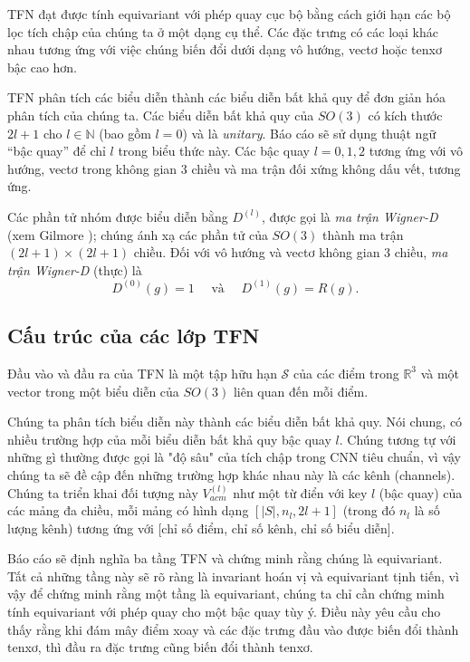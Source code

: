 TFN đạt được tính equivariant với phép quay cục bộ bằng cách giới hạn các bộ lọc tích chập của chúng ta ở một dạng cụ thể. Các
đặc trưng có các loại khác nhau tương ứng với việc chúng biến đổi dưới dạng vô hướng, vectơ hoặc tenxơ bậc cao hơn\cite{thomas2018tensorfieldnetworksrotation}. 

TFN phân tích các biểu diễn thành các biểu diễn bất khả quy để đơn giản hóa phân tích của chúng ta. Các biểu diễn
bất khả quy của $SO(3)$ có kích thước $2l+1$ cho $l \in \mathbb{N}$ (bao gồm $l=0$) và là \textit{unitary}. Báo cáo sẽ sử dụng thuật ngữ “bậc quay” để chỉ $l$ trong biểu thức này. Các bậc quay $l=0, 1, 2$  tương ứng với vô hướng, vectơ trong không gian 3 chiều và ma trận đối xứng không dấu vết, tương ứng.

Các phần tử nhóm được biểu diễn bằng $D^{(l)}$, được gọi là \textit{ma trận Wigner-D} (xem Gilmore \cite{gilmore2008lie}); chúng ánh xạ các phần tử của $SO(3)$ thành ma trận $(2l+1) \times (2l+1)$ chiều. Đối với vô hướng và vectơ không gian 3 chiều, \textit{ma trận Wigner-D} (thực) là
$$
D^{(0)}(g) = 1 \quad \text{ và } \quad D^{(1)}(g) = R(g).
$$

\subsection{Cấu trúc của các lớp TFN}
Đầu vào và đầu ra của TFN là một tập hữu hạn $\mathcal{S}$ của các điểm trong $\mathbb{R}^3$ và một vector trong một biểu diễn của $SO(3)$ liên quan đến mỗi điểm\cite{thomas2018tensorfieldnetworksrotation}.

Chúng ta phân tích biểu diễn này thành các biểu diễn bất khả quy. Nói chung, có nhiều trường hợp của mỗi biểu diễn bất khả quy bậc quay $l$. Chúng tương tự với những gì thường được gọi là "độ sâu" của tích chập trong CNN tiêu chuẩn, vì vậy chúng ta sẽ đề cập đến những trường hợp khác nhau này là các kênh (channels). Chúng ta triển khai đối tượng này $V^{(l)}_{acm}$ như một từ điển với key $l$ (bậc quay) của các mảng đa chiều, mỗi mảng có hình dạng $[|S|, n_l, 2l + 1]$ (trong đó $n_l$ là số lượng kênh) tương ứng với [chỉ số điểm, chỉ số kênh, chỉ số biểu diễn]. %

Báo cáo sẽ định nghĩa ba tầng TFN và chứng minh rằng chúng là equivariant. Tất cả những tầng này sẽ rõ ràng là invariant hoán vị và equivariant tịnh tiến, vì vậy để chứng minh rằng một tầng là equivariant, chúng ta chỉ cần chứng minh tính equivariant với phép quay cho một bậc quay tùy ý. Điều này yêu cầu cho thấy rằng khi đám mây điểm xoay và các đặc trưng đầu vào được biến đổi thành tenxơ, thì đầu ra đặc trưng cũng biến đổi thành tenxơ. 


